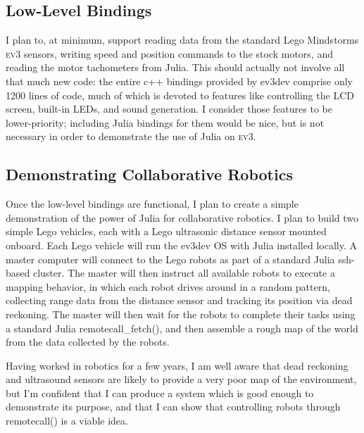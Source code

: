 \documentclass[]{article}
\newcommand{\ev}{\textsc{ev3}}
\begin{document}
\subsection{Low-Level Bindings}
I plan to, at minimum, support reading data from the standard Lego Mindstorms \ev{} sensors, writing speed and position commands to the stock motors, and reading the motor tachometers from Julia. This should actually not involve all that much new code: the entire c++ bindings provided by ev3dev comprise only 1200 lines of code, much of which is devoted to features like controlling the LCD screen, built-in LEDs, and sound generation. I consider those features to be lower-priority; including Julia bindings for them would be nice, but is not necessary in order to demonstrate the use of Julia on \ev{}. 

\subsection{Demonstrating Collaborative Robotics}
Once the low-level bindings are functional, I plan to create a simple demonstration of the power of Julia for collaborative robotics. I plan to build two simple Lego vehicles, each with a Lego ultrasonic distance sensor mounted onboard. Each Lego vehicle will run the ev3dev OS with Julia installed locally. A master computer will connect to the Lego robots as part of a standard Julia ssh-based cluster. The master will then instruct all available robots to execute a mapping behavior, in which each robot drives around in a random pattern, collecting range data from the distance sensor and tracking its position via dead reckoning. The master will then wait for the robots to complete their tasks using a standard Julia remotecall\_fetch(), and then assemble a rough map of the world from the data collected by the robots. 

Having worked in robotics for a few years, I am well aware that dead reckoning and ultrasound sensors are likely to provide a very poor map of the environment, but I'm confident that I can produce a system which is good enough to demonstrate its purpose, and that I can show that controlling robots through remotecall() is a viable idea. 
\end{document}
